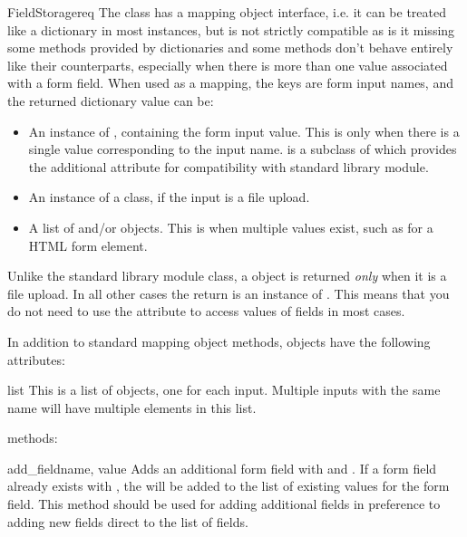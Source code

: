 \begin{classdesc}{FieldStorage}{req}
  The  class has a mapping object interface, i.e. it
  can be treated like a dictionary in most instances, but is not strictly
  compatible as is it missing some methods provided by dictionaries and
  some methods don't behave entirely like their counterparts, especially
  when there is more than one value associated with a form field. When used
  as a mapping, the keys are form input names, and the returned dictionary
  value can be:

  \begin{itemize}
  \item
    An instance of , containing the form input
    value. This is only when there is a single value corresponding to the
    input name.  is a subclass of  which
    provides the additional  attribute for compatibility
    with standard library  module.
  \item
    An instance of a  class, if the input is a file upload.
  \item
    A list of  and/or  objects. This is
    when multiple values exist, such as for a  HTML form
    element.
  \end{itemize}

  \begin{notice}
    Unlike the standard library  module
     class, a  object is returned
    \emph{only} when it is a file upload. In all other cases the
    return is an instance of . This means that you
    do not need to use the  attribute to access values
    of fields in most cases.
  \end{notice}

  In addition to standard mapping object methods,  objects
  have the following attributes:

  \begin{memberdesc}{list}
    This is a list of  objects, one for each input. Multiple
    inputs with the same name will have multiple elements in this list.
  \end{memberdesc}

   methods:

  \begin{methoddesc}[FieldStorage]{add_field}{name, value}
    Adds an additional form field with  and .
    If a form field already exists with , the 
    will be added to the list of existing values for the form field.
    This method should be used for adding additional fields in
    preference to adding new fields direct to the list of fields.


\end{methoddesc}
\end{classdesc}
